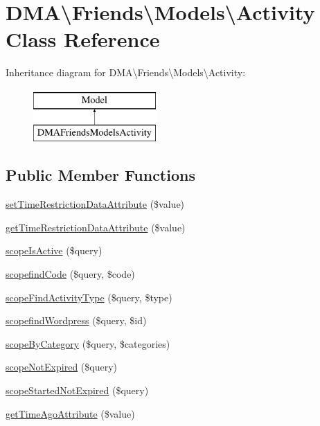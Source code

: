 \hypertarget{classDMA_1_1Friends_1_1Models_1_1Activity}{}\section{D\+M\+A\textbackslash{}Friends\textbackslash{}Models\textbackslash{}Activity Class Reference}
\label{classDMA_1_1Friends_1_1Models_1_1Activity}
Inheritance diagram for D\+M\+A\textbackslash{}Friends\textbackslash{}Models\textbackslash{}Activity\+:\begin{figure}[H]
\begin{center}
\leavevmode
\includegraphics[height=2.000000cm]{dc/d8c/classDMA_1_1Friends_1_1Models_1_1Activity}
\end{center}
\end{figure}
\subsection*{Public Member Functions}
\begin{DoxyCompactItemize}
\item 
\hyperlink{classDMA_1_1Friends_1_1Models_1_1Activity_ade0ffca24448c217def365d104e52866}{set\+Time\+Restriction\+Data\+Attribute} (\$value)
\item 
\hyperlink{classDMA_1_1Friends_1_1Models_1_1Activity_a98a904c739aca30f2a26152a481164b6}{get\+Time\+Restriction\+Data\+Attribute} (\$value)
\item 
\hyperlink{classDMA_1_1Friends_1_1Models_1_1Activity_acd3f12824d95be07b5221cdc9d64abf7}{scope\+Is\+Active} (\$query)
\item 
\hyperlink{classDMA_1_1Friends_1_1Models_1_1Activity_a9bb36aab36ff22a29b2a594617dd591c}{scopefind\+Code} (\$query, \$code)
\item 
\hyperlink{classDMA_1_1Friends_1_1Models_1_1Activity_aa17825817b73d3073e37d5e2c0933003}{scope\+Find\+Activity\+Type} (\$query, \$type)
\item 
\hyperlink{classDMA_1_1Friends_1_1Models_1_1Activity_a5a533a3f638f99d1dd0a8e0550def49e}{scopefind\+Wordpress} (\$query, \$id)
\item 
\hyperlink{classDMA_1_1Friends_1_1Models_1_1Activity_a0a9c5c7c4e86787534d2cbcbe5b03234}{scope\+By\+Category} (\$query, \$categories)
\item 
\hyperlink{classDMA_1_1Friends_1_1Models_1_1Activity_ac14ca246e8f6d0ab08327750717be982}{scope\+Not\+Expired} (\$query)
\item 
\hyperlink{classDMA_1_1Friends_1_1Models_1_1Activity_a2762d2faaa38b83ca6e79c2a7cb0d14c}{scope\+Started\+Not\+Expired} (\$query)
\item 
\hyperlink{classDMA_1_1Friends_1_1Models_1_1Activity_a03415578b3f688ecd26d27d9254d23ab}{get\+Time\+Ago\+Attribute} (\$value)
\end{DoxyCompactItemize}
